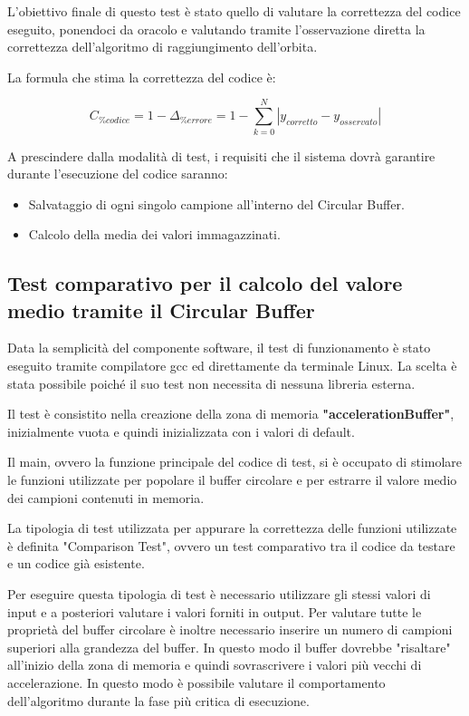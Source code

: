 \documentclass[LaM,binding=0.6cm]{../sapthesis}
\begin{document}
L'obiettivo finale di questo test è stato quello di valutare la correttezza del codice eseguito, ponendoci da oracolo e valutando tramite l'osservazione diretta la correttezza dell'algoritmo di raggiungimento dell'orbita.

La formula che stima la correttezza del codice è:

\begin{equation}
     C_{\% codice}  = 1 - \Delta_{\% errore} = 1 - \sum_{k=0}^{N} | y_{corretto} - y_{osservato} |
\end{equation}

A prescindere dalla modalità di test, i requisiti che il sistema dovrà garantire durante l'esecuzione del codice saranno:
\begin{itemize}
    \item Salvataggio di ogni singolo campione all'interno del Circular Buffer.
    
    \item Calcolo della media dei valori immagazzinati.
    
\end{itemize}
\subsection{Test comparativo per il calcolo del valore medio tramite il Circular Buffer}

Data la semplicità del componente software, il test di funzionamento è stato eseguito tramite compilatore gcc ed direttamente da terminale Linux. La scelta è stata possibile poiché il suo test non necessita di nessuna libreria esterna.

Il test è consistito nella creazione della zona di memoria \textbf{"accelerationBuffer"}, inizialmente vuota e quindi inizializzata con i valori di default.

Il main, ovvero la funzione principale del codice di test, si è occupato di stimolare le funzioni utilizzate per popolare il buffer circolare e per estrarre il valore medio dei campioni contenuti in memoria.

La tipologia di test utilizzata per appurare la correttezza delle funzioni utilizzate è definita "Comparison Test", ovvero un test comparativo tra il codice da testare e un codice già esistente.

Per eseguire questa tipologia di test è necessario utilizzare gli stessi valori di input e a posteriori valutare i valori forniti in output. Per valutare tutte le proprietà del buffer circolare è inoltre necessario inserire un numero di campioni superiori alla grandezza del buffer. In questo modo il buffer dovrebbe "risaltare" all'inizio della zona di memoria e quindi sovrascrivere i valori più vecchi di accelerazione. In questo modo è possibile valutare il comportamento dell'algoritmo durante la fase più critica di esecuzione.
\end{document}
